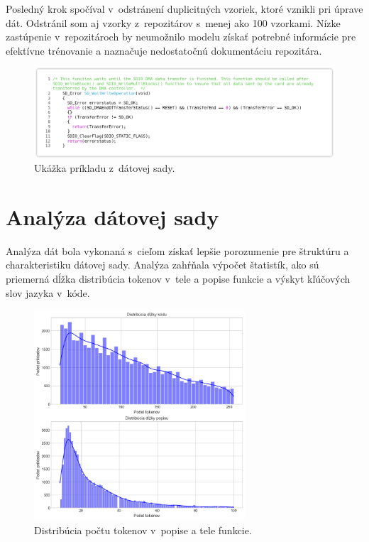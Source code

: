 Posledný krok spočíval v~odstránení duplicitných vzoriek, ktoré vznikli pri úprave dát. Odstránil som aj vzorky z~repozitárov s~menej ako 100 vzorkami. Nízke zastúpenie v~repozitároch by neumožnilo modelu získať potrebné informácie pre efektívne trénovanie a naznačuje nedostatočnú dokumentáciu repozitára.

\begin{figure}[H]
    \centering
    \includegraphics[width=1\textwidth]{obrazky/sample.png}
    \caption{Ukážka príkladu z~dátovej sady.}
    \label{fig:sample}
\end{figure}

\section{Analýza dátovej sady}\label{sec:dataset-analysis}
Analýza dát bola vykonaná s~cieľom získať lepšie porozumenie pre štruktúru a charakteristiku dátovej sady. Analýza zahŕňala výpočet štatistík, ako sú priemerná dĺžka distribúcia tokenov v~tele a popise funkcie a výskyt kľúčových slov jazyka v~kóde.

\begin{figure}[!ht]
    \centering
    \includegraphics[width=0.7\textwidth]{obrazky/token_dist.png}
    \caption{Distribúcia počtu tokenov v~popise a tele funkcie.}
    \label{fig:token-dist}
\end{figure}

